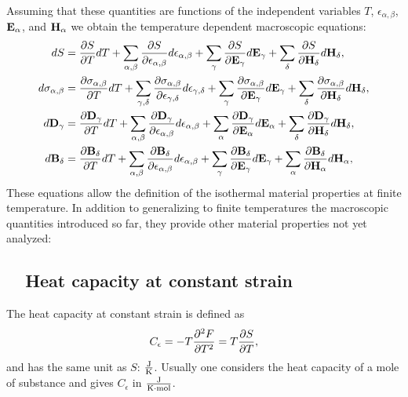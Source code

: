 \documentclass[12pt,a4paper,twoside]{report}
\begin{document}
Assuming that these quantities are functions of the independent variables
$T$, $\epsilon_{\alpha,\beta}$, ${\bf E}_\alpha$, and ${\bf H}_\alpha$ we
obtain the temperature dependent macroscopic equations:
\begin{align}
dS&= {\partial S \over \partial T} dT+\sum_{\alpha,\beta}
{\partial S \over \partial \epsilon_{\alpha,\beta}}d\epsilon_{\alpha,\beta}
+\sum_\gamma{\partial S \over \partial {\bf E}_{\gamma}}d{\bf E}_{\gamma}+ 
\sum_\delta{\partial S \over \partial {\bf H}_{\delta}}d{\bf H}_{\delta}, \\
d\sigma_{\alpha,\beta}&=
{\partial \sigma_{\alpha,\beta} \over \partial T} dT+\sum_{\gamma,\delta}
{\partial \sigma_{\alpha,\beta} \over \partial 
\epsilon_{\gamma,\delta}}d\epsilon_{\gamma,\delta}
+\sum_\gamma{\partial \sigma_{\alpha,\beta} \over \partial 
{\bf E}_{\gamma}}d{\bf E}_{\gamma}+ 
\sum_\delta{\partial \sigma_{\alpha,\beta} \over \partial 
{\bf H}_{\delta}}d{\bf H}_{\delta}, \\
d{\bf D}_\gamma&=
{\partial  {\bf D}_\gamma \over \partial T} dT+\sum_{\alpha,\beta}
{\partial {\bf D}_\gamma \over \partial \epsilon_{\alpha,\beta}}
d\epsilon_{\alpha,\beta}
+\sum_\alpha{\partial {\bf D}_\gamma \over \partial {\bf E}_{\alpha}}d{\bf E}_{\alpha}+ 
\sum_\delta{\partial {\bf D}_\gamma \over \partial {\bf H}_{\delta}}d{\bf H}_{\delta}, \\
d{\bf B}_\delta&=
{\partial {\bf B}_\delta \over \partial T} dT+\sum_{\alpha,\beta}
{\partial {\bf B}_\delta \over \partial \epsilon_{\alpha,\beta}}
d\epsilon_{\alpha,\beta}
+\sum_\gamma{\partial {\bf B}_\delta \over \partial {\bf E}_{\gamma}}
d{\bf E}_{\gamma}+ 
\sum_\alpha{\partial {\bf B}_\delta \over \partial {\bf H}_{\alpha}}
d{\bf H}_{\alpha}, 
\end{align}
These equations allow the definition of the isothermal material properties 
at finite temperature. In addition to generalizing to finite temperatures
the macroscopic quantities introduced so far, they provide other material 
properties not yet analyzed:

\subsection{\ \ Heat capacity at constant strain}
The heat capacity at constant strain is defined as
\begin{equation}
C_\epsilon= - T {\partial^2 F \over \partial T^2} = 
T {\partial S \over \partial T},
\end{equation}
and has the same unit as $S$: ${\rm J}\over {\rm K}$. Usually one considers the heat
capacity of a mole of substance and gives $C_\epsilon$ in 
${{\rm J}\over {\rm K} \cdot {\rm mol}}$.
\end{document}
